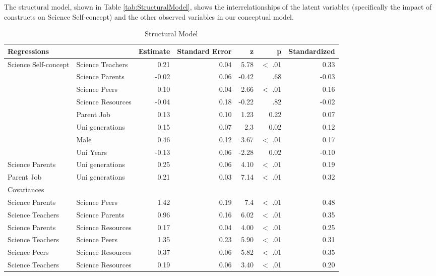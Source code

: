 The structural model, shown in Table \ref{tab:StructuralModel}, shows the interrelationships of the latent variables (specifically the impact of constructs on Science Self-concept) and the other observed variables in our conceptual model. 

\begin{table}[ht]
\caption{Structural Model} 

\centering
\begin{tabular}{llrrrrr}
  \hline
 Regressions &  & Estimate & Standard Error & z & p & Standardized \\ 
  \hline

  Science Self-concept & Science Teachers & 0.21 & 0.04 & 5.78 & $<$ .01 & 0.33 \\ 
   & Science Parents & -0.02 & 0.06 & -0.42 & .68 & -0.03 \\ 
   & Science Peers & 0.10 & 0.04 & 2.66 & $<$ .01 & 0.16 \\ 
   & Science Resources & -0.04 & 0.18 & -0.22 & .82 & -0.02 \\ 
   & Parent Job & 0.13 & 0.10 & 1.23 & 0.22 & 0.07 \\ 
   & Uni generations & 0.15 & 0.07 & 2.3 & 0.02 & 0.12 \\ 
   & Male & 0.46 & 0.12 & 3.67 & $<$ .01 & 0.17 \\ 
   & Uni Years & -0.13 & 0.06 & -2.28 & 0.02 & -0.10 \\ 
  Science Parents & Uni generations & 0.25 & 0.06 & 4.10 & $<$ .01 & 0.19 \\ 
  Parent Job & Uni generations & 0.21 & 0.03 & 7.14 & $<$ .01 & 0.32 \\ 
  \hline
Covariances &  &  &  &  & &  \\ 
  \hline
  Science Parents & Science Peers & 1.42 & 0.19 & 7.4 & $<$ .01 & 0.48 \\ 
  Science Teachers & Science Parents & 0.96 & 0.16 & 6.02 & $<$ .01 & 0.35 \\ 
  Science Parents & Science Resources & 0.17 & 0.04 & 4.00 & $<$ .01 & 0.25 \\ 
  Science Teachers & Science Peers & 1.35 & 0.23 & 5.90 & $<$ .01 & 0.31 \\ 
  Science Peers & Science Resources & 0.37 & 0.06 & 5.82 & $<$ .01 & 0.35 \\ 
  Science Teachers & Science Resources & 0.19 & 0.06 & 3.40 & $<$ .01 & 0.20 \\ 
   

\end{tabular}
\end{table}
